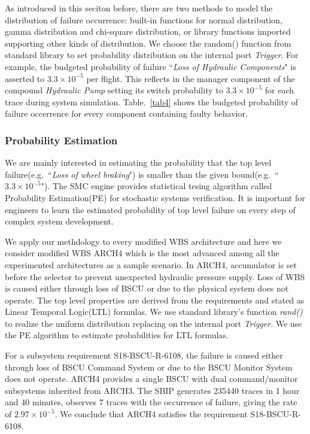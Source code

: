As introduced in this seciton before, there are two methods to model the distribution of failure occurrence: built-in functions for normal distribution, gamma distribution and chi-square distribution, or library functions imported supporting other kinds of distribution. We choose the random() function from standard library to set probability distribution on the internal port \emph{Trigger}. For example, the budgeted probability of failure ``\emph{Loss of Hydraulic Components}" is asserted to $3.3\times10^{-5}$ per flight. This reflects in the manager component of the compound \emph{Hydraulic Pump} setting its switch probability to $3.3\times10^{-5}$ for each trace during system simulation. Table.~\ref{tab4} shows the budgeted probability of failure occerrence for every component containing faulty behavior.

\subsubsection{Probability Estimation}
We are mainly interested in estimating the probability that the top level failure(e.g.\ ``\emph{Loss of wheel braking}") is smaller than the given bound(e.g.\ ``$3.3\times10^{-5}$"). The SMC engine provides statistical tesing algorithm called Probability Estimation(PE)\cite{pe04} for stochastic systems verification. It is important for engineers to learn the estimated probability of top level failure on every step of complex system development.

We apply our methdology to every modified WBS architecture and here we consider modified WBS ARCH4 which is the most advanced among all the experimented architectures as a sample scenario.
In ARCH4, accumulator is set before the selector to prevent unexpected hydraulic pressure supply. Loss of WBS is caused either through loss of BSCU or due to the physical system does not operate. The top level properties are derived from the requirements and stated as Linear Temporal Logic(LTL) formulas. We use standard library's function \emph{rand()} to realize the uniform distribution\cite{uniform} replacing on the internal port \emph{Trigger}. We use the PE algorithm to estimate probabilities for LTL formulas. 

For a subsystem requirement S18-BSCU-R-6108, the failure is caused either through loss of BSCU Command System or due to the BSCU Monitor System does not operate. ARCH4 provides a single BSCU with dual command/monitor subsystems inherited from ARCH3. The SBIP generates 235440 traces in 1 hour and 40 minutes, observes 7 traces with the occurrence of failure, giving the rate of $2.97\times10^{-5}$. We conclude that ARCH4 satisfies the requirement S18-BSCU-R-6108.

